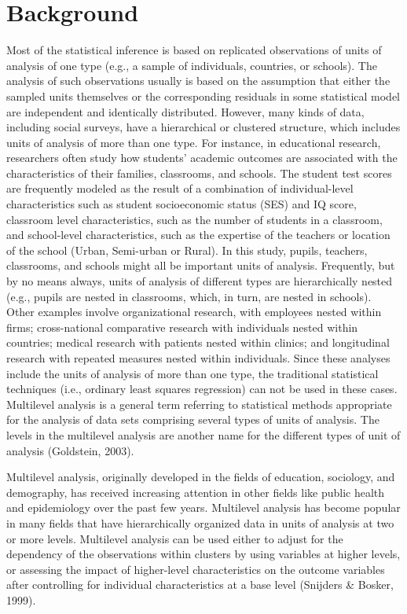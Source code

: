 \documentclass[12pt,oneside,a4paper]{reedthesis}
\begin{document}
\hypertarget{background}{%
\section{Background}\label{background}}

Most of the statistical inference is based on replicated observations of units of analysis of one type (e.g., a sample of individuals, countries, or schools). The analysis of such observations usually is based on the assumption that either the sampled units themselves or the corresponding residuals in some statistical model are independent and identically distributed. However, many kinds of data, including social surveys, have a hierarchical or clustered structure, which includes units of analysis of more than one type. For instance, in educational research, researchers often study how students' academic outcomes are associated with the characteristics of their families, classrooms, and schools. The student test scores are frequently modeled as the result of a combination of individual-level characteristics such as student socioeconomic status (SES) and IQ score, classroom level characteristics, such as the number of students in a classroom, and school-level characteristics, such as the expertise of the teachers or location of the school (Urban, Semi-urban or Rural). In this study, pupils, teachers, classrooms, and schools might all be important units of analysis. Frequently, but by no means always, units of analysis of different types are hierarchically nested (e.g., pupils are nested in classrooms, which, in turn, are nested in schools). Other examples involve organizational research, with employees nested within firms; cross-national comparative research with individuals nested within countries; medical research with patients nested within clinics; and longitudinal research with repeated measures nested within individuals.
Since these analyses include the units of analysis of more than one type, the traditional statistical techniques (i.e., ordinary least squares regression) can not be used in these cases. Multilevel analysis is a general term referring to statistical methods appropriate for the analysis of data sets comprising several types of units of analysis. The levels in the multilevel analysis are another name for the different types of unit of analysis (Goldstein, 2003).

Multilevel analysis, originally developed in the fields of education, sociology, and demography, has received increasing attention in other fields like public health and epidemiology over the past few years. Multilevel analysis has become popular in many fields that have hierarchically organized data in units of analysis at two or more levels. Multilevel analysis can be used either to adjust for the dependency of the observations within clusters by using variables at higher levels, or assessing the impact of higher-level characteristics on the outcome variables after controlling for individual characteristics at a base level (Snijders \& Bosker, 1999).
\end{document}
